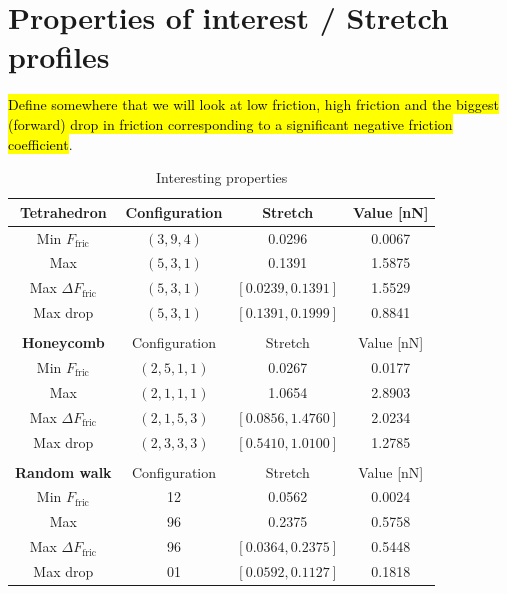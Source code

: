 \section{Properties of interest / Stretch profiles}
\hl{Define somewhere that we will look at low friction, high friction and the biggest (forward) drop in friction corresponding to a significant negative friction coefficient}.



\begin{table}[H]
  \begin{center}
  \caption{Interesting properties}
  \label{tab:}
  \begin{tabular}{| c | c | c | c|} \hline
  \textbf{Tetrahedron} & Configuration & Stretch & Value [nN]  \\ \hline
  Min $F_{\text{fric}}$ & $(3,9,4)$ &  0.0296 & 0.0067 \\ \hline
  Max & $(5,3,1)$ & 0.1391 & 1.5875 \\ \hline
  Max $\Delta F_{\text{fric}}$  & $(5, 3, 1)$ & $[0.0239, 0.1391]$ & 1.5529 \\ \hline
  Max drop & $(5,3,1)$ & $[0.1391, 0.1999]$ & 0.8841 \\ \hline
  \multicolumn{4}{c}{} \\ \hline
  \textbf{Honeycomb} & Configuration & Stretch & Value [nN]  \\ \hline
  Min $F_{\text{fric}}$ & $(2, 5, 1, 1)$ &  0.0267 & 0.0177 \\ \hline
  Max & $(2, 1, 1, 1)$ & 1.0654 & 2.8903 \\ \hline
  Max $\Delta F_{\text{fric}}$  & $(2, 1, 5, 3)$ & $[0.0856, 1.4760]$ & 2.0234 \\ \hline
  Max drop & $(2, 3, 3, 3)$ & $[0.5410, 1.0100]$ & 1.2785 \\ \hline
  \multicolumn{4}{c}{} \\ \hline
  \textbf{Random walk} & Configuration & Stretch & Value [nN]  \\ \hline
  Min $F_{\text{fric}}$ & 12 &  0.0562 & 0.0024\\ \hline
  Max & 96 & 0.2375 & 0.5758 \\ \hline
  Max $\Delta F_{\text{fric}}$  & 96 & $[0.0364, 0.2375]$ & 0.5448 \\ \hline
  Max drop & 01 & $[0.0592, 0.1127]$ & 0.1818 \\ \hline
\end{tabular}
\end{center}
\end{table}


